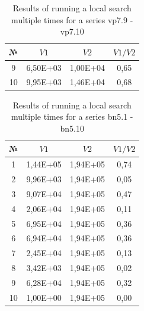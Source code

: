 \documentclass{ifacconf}
\begin{document}
\begin{table}[ht]
	\centering
	\begin{tabular}{|c|c|c|c|}
		\hline
		\hspace*{0.1cm}№\hspace*{0.1cm} &
		\hspace*{0.1cm}$V1$\hspace*{0.1cm}&
		\hspace*{0.1cm}$V2$\hspace*{0.1cm}&
		\hspace*{0.1cm}$V1/V2$\hspace*{0.1cm}\\
		\hline
		9  & 6,50E+03  &  1,00E+04  &  0,65\\
		10 & 9,95E+03  &  1,46E+04  &  0,68\\
		\hline
	\end{tabular}
	\caption{Results of running a local search multiple times for a series vp7.9 - vp7.10}	\label{spher_vp7}
\end{table}
\begin{table}[h!]
	\vspace{1cm}
	\centering
	\begin{tabular}{|c|c|c|c|}
		\hline
		\hspace*{0.1cm}№\hspace*{0.1cm} &
		\hspace*{0.1cm}$V1$\hspace*{0.1cm}&
		\hspace*{0.1cm}$V2$\hspace*{0.1cm}&
		\hspace*{0.1cm}$V1/V2$\hspace*{0.1cm}\\
		\hline
		1 &  1,44E+05  &  1,94E+05  &  0,74\\
		2 &  9,96E+03  &  1,94E+05  &  0,05\\
		3 &  9,07E+04  &  1,94E+05  &  0,47\\
		4 &  2,06E+04  &  1,94E+05  &  0,11\\
		5 &  6,95E+04  &  1,94E+05  &  0,36\\
		6 &  6,94E+04  &  1,94E+05  &  0,36\\
		7 &  2,45E+04  &  1,94E+05  &  0,13\\
		8 &  3,42E+03  &  1,94E+05  &  0,02\\
		9 &  6,28E+04  &  1,94E+05  &  0,32\\
		10&  1,00E+00  &  1,94E+05  &  0,00\\
		\hline
	\end{tabular}
	\vspace{1em}
	\caption{Results of running a local search multiple times for a series bn5.1 - bn5.10}	\label{spher_bn}
\end{table}
\end{document}
